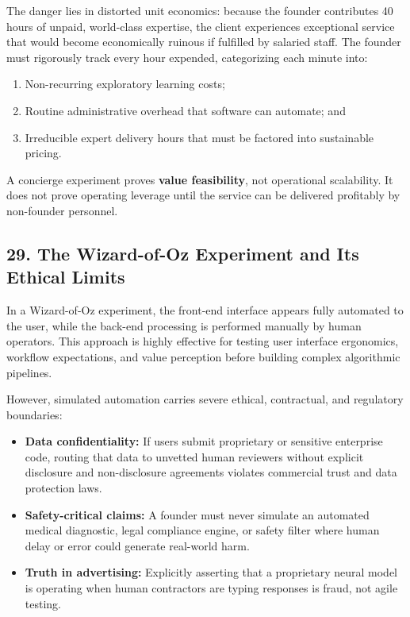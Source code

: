 The danger lies in distorted unit economics: because the founder contributes 40 hours of unpaid, world-class expertise, the client experiences exceptional service that would become economically ruinous if fulfilled by salaried staff. The founder must rigorously track every hour expended, categorizing each minute into:
\begin{enumerate}
    \item Non-recurring exploratory learning costs;
    \item Routine administrative overhead that software can automate; and
    \item Irreducible expert delivery hours that must be factored into sustainable pricing.
\end{enumerate}

A concierge experiment proves \textbf{value feasibility}, not operational scalability. It does not prove operating leverage until the service can be delivered profitably by non-founder personnel.

\subsection*{29. The Wizard-of-Oz Experiment and Its Ethical Limits}

In a Wizard-of-Oz experiment, the front-end interface appears fully automated to the user, while the back-end processing is performed manually by human operators. This approach is highly effective for testing user interface ergonomics, workflow expectations, and value perception before building complex algorithmic pipelines.

However, simulated automation carries severe ethical, contractual, and regulatory boundaries:
\begin{itemize}
    \item \textbf{Data confidentiality:} If users submit proprietary or sensitive enterprise code, routing that data to unvetted human reviewers without explicit disclosure and non-disclosure agreements violates commercial trust and data protection laws.
    \item \textbf{Safety-critical claims:} A founder must never simulate an automated medical diagnostic, legal compliance engine, or safety filter where human delay or error could generate real-world harm.
    \item \textbf{Truth in advertising:} Explicitly asserting that a proprietary neural model is operating when human contractors are typing responses is fraud, not agile testing.
\end{itemize}

